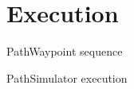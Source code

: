 \section{Execution}

\begin{frame}{Path}{Waypoint sequence}



\end{frame}

\begin{frame}{Path}{Simulator execution}



\end{frame}

